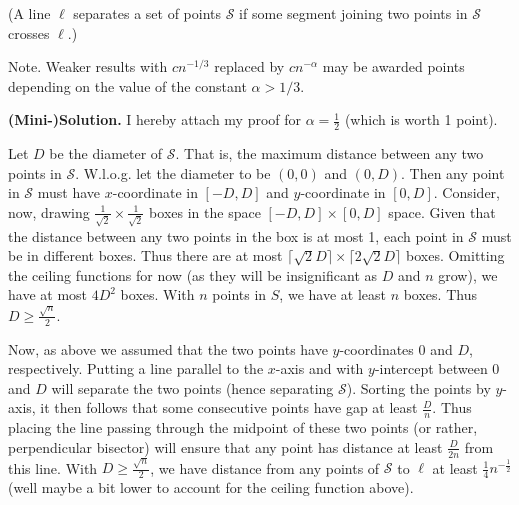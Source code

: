 \documentclass[11pt,a4paper]{article}
\begin{document}
\begin{enumerate}
	(A line $\ell$ separates a set of points $\mathcal{S}$ if some segment joining two points in $\mathcal S$ crosses $\ell$.)
	
	Note. Weaker results with $cn^{-1/3}$ replaced by $cn^{-\alpha}$ may be awarded points depending on the value of the constant $\alpha > 1/3$.
	
	\textbf{(Mini-)Solution.} I hereby attach my proof for $\alpha=\frac 12$ (which is worth 1 point). 
	
	Let $D$ be the diameter of $\mathcal{S}$. That is, the maximum distance between any two points in $\mathcal{S}$. W.l.o.g. let the diameter to be $(0, 0)$ and $(0, D)$. Then any point in $\mathcal{S}$ must have $x$-coordinate in $[-D, D]$ and $y$-coordinate in $[0, D]$. 
	Consider, now, drawing $\frac{1}{\sqrt{2}}\times \frac{1}{\sqrt{2}}$ boxes in the space $[-D, D]\times [0, D]$ space. Given that the distance between any two points in the box is at most 1, each point in $\mathcal{S}$ must be in different boxes. Thus there are at most $\lceil \sqrt{2}D\rceil\times \lceil 2\sqrt{2}D\rceil $ boxes. Omitting the ceiling functions for now (as they will be insignificant as $D$ and $n$ grow), we have at most $4D^2$ boxes. With $n$ points in $S$, we have at least $n$ boxes. Thus $D\ge\frac{\sqrt{n}}{2}$. 
	
	Now, as above we assumed that the two points have $y$-coordinates 0 and $D$, respectively. Putting a line parallel to the $x$-axis and with $y$-intercept between 0 and $D$ will separate the two points (hence separating $\mathcal{S}$). Sorting the points by $y$-axis, it then follows that some consecutive points have gap at least $\frac{D}{n}$. Thus placing the line passing through the midpoint of these two points (or rather, perpendicular bisector) will ensure that any point has distance at least $\frac{D}{2n}$ from this line. With $D\ge \frac{\sqrt{n}}{2}$, we have distance from any points of $\mathcal{S}$ to $\ell$ at least $\frac 14 n^{-\frac 12}$ (well maybe a bit lower to account for the ceiling function above). 
\end{enumerate}
\end{document}
